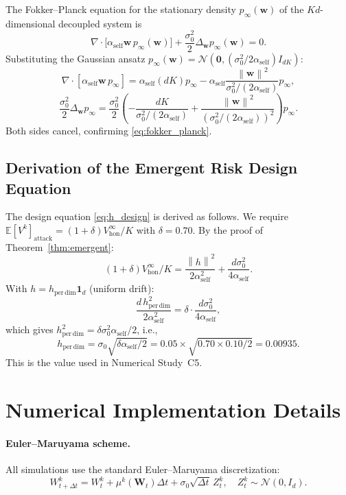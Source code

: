 \documentclass[12pt]{article}
\theoremstyle{plain}
\theoremstyle{definition}
\newcommand{\E}{\mathbb{E}}
\newcommand{\W}{\mathbf{W}}
\newcommand{\norm}[1]{\left\lVert #1 \right\rVert}
\begin{document}
The Fokker--Planck equation for the stationary density
$p_\infty(\mathbf{w})$ of the $Kd$-dimensional decoupled system is
\begin{equation}
  \nabla \cdot \bigl[\alpha_{\mathrm{self}} \mathbf{w}\, p_\infty(\mathbf{w})\bigr]
  + \frac{\sigma_0^2}{2} \Delta_{\mathbf{w}} p_\infty(\mathbf{w}) = 0.
  \label{eq:fokker_planck}
\end{equation}
Substituting the Gaussian ansatz
$p_\infty(\mathbf{w}) = \mathcal{N}(\mathbf{0}, (\sigma_0^2/2\alpha_{\mathrm{self}})I_{dK})$:
\[
  \nabla \cdot [\alpha_{\mathrm{self}} \mathbf{w}\, p_\infty]
  = \alpha_{\mathrm{self}}(dK) p_\infty - \alpha_{\mathrm{self}}
    \frac{\norm{\mathbf{w}}^2}{\sigma_0^2/(2\alpha_{\mathrm{self}})} p_\infty,
\]
\[
  \frac{\sigma_0^2}{2} \Delta_{\mathbf{w}} p_\infty
  = \frac{\sigma_0^2}{2}\left(-\frac{dK}{\sigma_0^2/(2\alpha_{\mathrm{self}})}
  + \frac{\norm{\mathbf{w}}^2}{(\sigma_0^2/(2\alpha_{\mathrm{self}}))^2}\right) p_\infty.
\]
Both sides cancel, confirming \eqref{eq:fokker_planck}.

\subsection{Derivation of the Emergent Risk Design Equation}

The design equation \eqref{eq:h_design} is derived as follows.  We
require $\E[V^k]_{\mathrm{attack}} = (1 + \delta) V^\infty_{\mathrm{hon}} / K$
with $\delta = 0.70$.  By the proof of Theorem~\ref{thm:emergent}:
\[
  (1 + \delta) V^\infty_{\mathrm{hon}} / K
  = \frac{\norm{h}^2}{2\alpha_{\mathrm{self}}^2}
  + \frac{d\sigma_0^2}{4\alpha_{\mathrm{self}}}.
\]
With $h = h_{\mathrm{per\,dim}} \bm{1}_d$ (uniform drift):
\[
  \frac{d\,h_{\mathrm{per\,dim}}^2}{2\alpha_{\mathrm{self}}^2}
  = \delta \cdot \frac{d\sigma_0^2}{4\alpha_{\mathrm{self}}},
\]
which gives
$h_{\mathrm{per\,dim}}^2 = \delta\sigma_0^2\alpha_{\mathrm{self}} / 2$,
i.e.,
\[
  h_{\mathrm{per\,dim}} = \sigma_0 \sqrt{\delta\alpha_{\mathrm{self}}/2}
  = 0.05 \times \sqrt{0.70 \times 0.10/2} = 0.00935.
\]
This is the value used in Numerical Study~C5.

\section{Numerical Implementation Details}
\label{app:numerical}

\paragraph{Euler--Maruyama scheme.}
All simulations use the standard Euler--Maruyama discretization:
\[
  W^k_{t+\Delta t} = W^k_t + \mu^k(\W_t)\Delta t
  + \sigma_0 \sqrt{\Delta t}\, Z^k_t, \quad Z^k_t \sim \mathcal{N}(0, I_d).
\]
\end{document}
